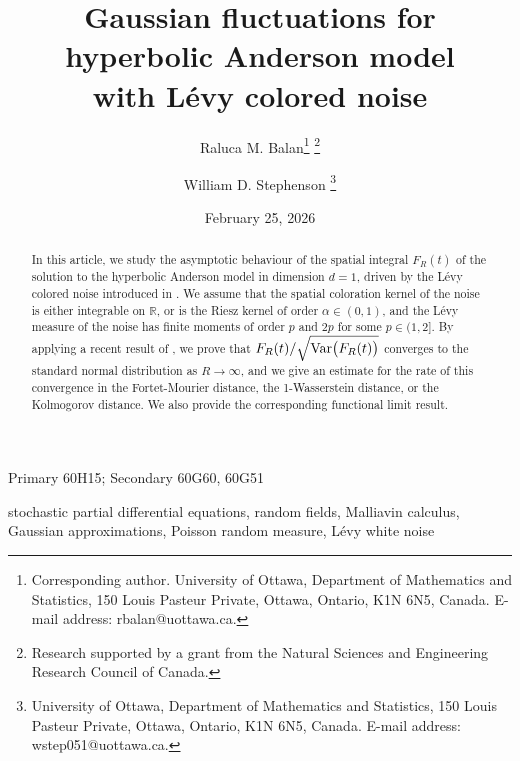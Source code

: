 \documentclass[12pt]{article}
\def\bR{\mathbb{R}}
\begin{document}
\title{Gaussian fluctuations for hyperbolic Anderson model \\
with L\'evy colored noise}

\author{Raluca M. Balan\footnote{Corresponding author. University of Ottawa, Department of Mathematics and Statistics, 150 Louis Pasteur Private, Ottawa, Ontario, K1N 6N5, Canada. E-mail address: rbalan@uottawa.ca.} \footnote{Research supported by a grant from the Natural Sciences and Engineering Research Council of Canada.}
\and
William D. Stephenson \footnote{University of Ottawa, Department of Mathematics and Statistics, 150 Louis Pasteur Private, Ottawa, Ontario, K1N 6N5, Canada. E-mail address: wstep051@uottawa.ca.}
}

\date{February 25, 2026}
\maketitle

\begin{abstract}
\noindent In this article, we study the asymptotic behaviour of the spatial integral $F_R(t)$ of the solution to the hyperbolic Anderson model in dimension $d=1$, driven by the L\'evy colored noise introduced in \cite{BJ25}. We assume that the spatial coloration kernel of the noise is either integrable on $\bR$, or is the Riesz kernel of order $\alpha \in (0,1)$, and the L\'evy measure of the noise has finite moments of order $p$ and $2p$ for some $p \in (1,2]$. By applying a recent result of \cite{trauthwein25}, we prove that $F_R(t)/\sqrt{{\rm Var}\big(F_R(t)\big)}$ converges to the standard normal distribution as $R \to \infty$, and we give an estimate for the rate of this convergence in the Fortet-Mourier distance, the 1-Wasserstein distance, or the Kolmogorov distance. We also provide the corresponding functional limit result.
\end{abstract}



 Primary 60H15; Secondary 60G60, 60G51

\vspace{1mm}

 stochastic partial differential equations, random fields, Malliavin calculus, Gaussian approximations, Poisson random measure, L\'evy white noise

\pagebreak

\tableofcontents
\end{document}
